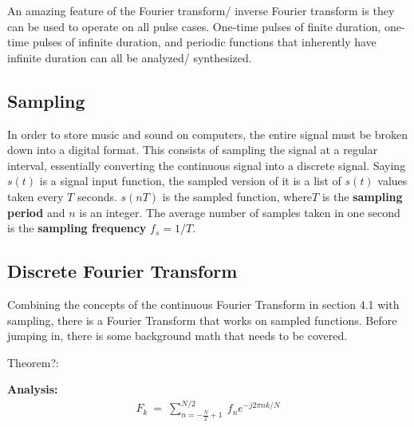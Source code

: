 \documentclass[10pt]{article}
\begin{document}
An amazing feature of the Fourier transform/ inverse Fourier transform is they can be used to operate on all pulse cases. One-time pulses of finite duration, one-time pulses of infinite duration, and periodic functions that inherently have infinite duration can all be analyzed/ synthesized.




\subsection{Sampling}
\hspace{\parindent} In order to store music and sound on computers, the entire signal must be broken down into a digital format. This consists of sampling the signal at a regular interval, essentially converting the continuous signal into a discrete signal. Saying $s(t)$ is a signal input function, the sampled version of it is a list of $s(t)$ values taken every $T$ seconds. $s(nT)$ is the sampled function, where$T$ is the \textbf{sampling period} and $n$ is an integer. The average number of samples taken in one second is the \textbf{sampling frequency} $f_s=1/T$.


\subsection{Discrete Fourier Transform}
\hspace{\parindent} Combining the concepts of the continuous Fourier Transform in section 4.1 with sampling, there is a Fourier Transform that works on sampled functions. Before jumping in, there is some background math that needs to be covered. 

Theorem?:

\textbf{Analysis:}
\begin{equation} \label{eq:3.4.1}
\begin{aligned}
    F_k \: = \: \sum_{n=-\frac{N}{2}+1}^{N/2} \: f_n e^{-j2\pi nk/ N}
\end{aligned}
\end{equation}
\end{document}
